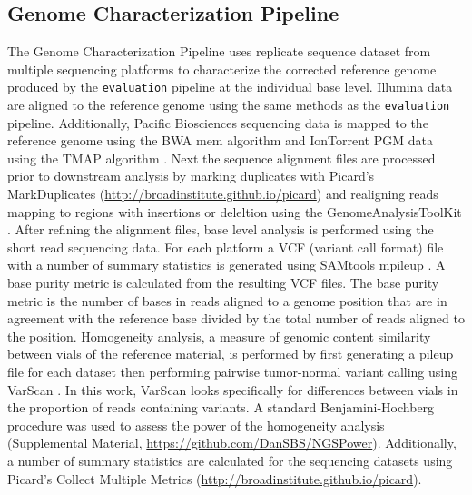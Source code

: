 \documentclass[smallextended]{svjour3}\usepackage[]{graphicx}\usepackage[]{color}
\begin{document}
\subsection{Genome Characterization Pipeline}
\label{method:3}
The Genome Characterization Pipeline uses replicate sequence dataset from multiple sequencing platforms to characterize the corrected reference genome produced by the \texttt{evaluation} pipeline at the individual base level. Illumina data are aligned to the reference genome using the same methods as the \texttt{evaluation} pipeline. Additionally, Pacific Biosciences sequencing data is mapped to the reference genome using the BWA mem algorithm \cite{Li2013c} and IonTorrent PGM data using the TMAP algorithm \cite{Homer}. Next the sequence alignment files are processed prior to downstream analysis by marking duplicates with Picard's MarkDuplicates (\url{http://broadinstitute.github.io/picard}) and realigning reads mapping to regions with insertions or deleltion using the GenomeAnalysisToolKit \cite{McKenna2010, DePristo12011}. After refining the alignment files, base level analysis is performed using the short read sequencing data.  For each platform a VCF (variant call format) file with a number of summary statistics is generated using SAMtools mpileup \cite{Li2009}. A base purity metric is calculated from the resulting VCF files. The base purity metric is the number of bases in reads aligned to a genome position that are in agreement with the reference base divided by the total number of reads aligned to the position. Homogeneity analysis, a measure of genomic content similarity between vials of the reference material, is performed by first generating a pileup file for each dataset then performing pairwise tumor-normal variant calling using VarScan \cite{Koboldt2009}. In this work, VarScan looks specifically for differences between vials in the proportion of reads containing variants. A standard Benjamini-Hochberg procedure was used to assess the power of the homogeneity analysis (Supplemental Material, \url{https://github.com/DanSBS/NGSPower}).  Additionally, a number of summary statistics are calculated for the sequencing datasets using Picard's Collect Multiple Metrics (\url{http://broadinstitute.github.io/picard}).  
\end{document}
